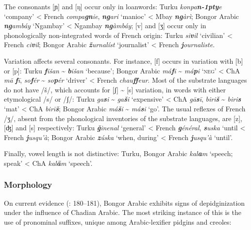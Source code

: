 \documentclass[output=paper]{langsci/langscibook}
\begin{document}
  The consonants [ɲ] and [ŋ] occur only in loanwords: Turku \textit{konpa}\textit{\textbf{n\kern -1pty}e} ‘company’ < French \textit{compa}\textit{\textbf{gn}ie}, \textit{\textbf{ng}ari} ‘manioc’ < Mbay \textit{\textbf{ng}àrì}; Bongor Arabic \textit{\textbf{ng}ambáy} ‘Ngambay’ < Ngambay \textit{\textbf{ng}àmbáy}; [v] and [ʒ] occur only in phonologically non-integrated words of French origin: Turku \textit{si}\textit{\textbf{v}il} ‘civilian’ < French \textit{ci}\textit{\textbf{v}il}; Bongor Arabic \textit{\textbf{ž}urnalíst} `journalist' < French \textit{\textbf{j}ournaliste}. 

   Variation affects several consonants. For instance, [f] occurs in variation with [b] or [p]: Turku \textit{\textbf{f}išan} {\textasciitilde} \textit{\textbf{b}išan} ‘because’; Bongor Arabic \textit{má}\textit{\textbf{f}i} {\textasciitilde} \textit{má}\textit{\textbf{p}i} ‘\textsc{neg}’ < ChA \textit{mā} \textit{\textbf{f}ī}, \textit{so}\textit{\textbf{f}ér} {\textasciitilde} \textit{so}\textit{\textbf{p}ér} ‘driver’ < French \textit{chau}\textit{\textbf{ff}eur}. Most of the substrate languages do not have /š/, which accounts for [ʃ] {\textasciitilde} [s] variation, in words with either etymological /s/ or /ʃ/: Turku \textit{ga\textbf{s}i} {\textasciitilde} \textit{ga\textbf{š}i} ‘expensive’ < ChA \textit{gā\textbf{s}ī}, \textit{biri\textbf{š}} {\textasciitilde} \textit{biri\textbf{s}} ‘mat’ < ChA \textit{birī\textbf{š}}; Bongor Arabic \textit{má\textbf{š}i} {\textasciitilde} \textit{má\textbf{s}i} ‘go’. The usual reflexes of French /ʒ/, absent from the phonological inventories of the substrate languages, are [z], [ʤ] and [s] respectively: Turku \textit{\textbf{ǧ}inenal} ‘general’ < French \textit{\textbf{g}énéral}, \textit{\textbf{s}uska} ‘until < French \textit{\textbf{j}usqu’à}; Bongor Arabic \textit{\textbf{z}úska} `when, during' < French \textit{\textbf{j}usqu’à} `until'.

Finally, vowel length is not distinctive: Turku, Bongor Arabic \textit{kal\textbf{a}m} ‘speech; speak’ < ChA \textit{kal\textbf{ā}m} ‘speech’.


 \subsubsection{Morphology}

On current evidence (\citealt{Luffin2013}: 180–181), Bongor Arabic exhibits signs of depidginization under the influence of Chadian Arabic. The most striking instance of this is the use of pronominal suffixes, unique among Arabic-lexifier pidgins and creoles:
\end{document}
